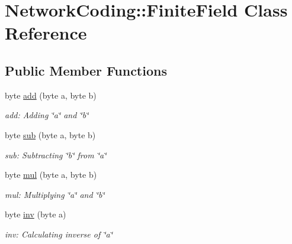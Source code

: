 \hypertarget{class_network_coding_1_1_finite_field}{}\section{Network\+Coding\+:\+:Finite\+Field Class Reference}
\label{class_network_coding_1_1_finite_field}
\subsection*{Public Member Functions}
\begin{DoxyCompactItemize}
\item 
byte \hyperlink{class_network_coding_1_1_finite_field_ad5d01d29f41b81e04c2c38774d46f9df}{add} (byte a, byte b)\hypertarget{class_network_coding_1_1_finite_field_ad5d01d29f41b81e04c2c38774d46f9df}{}\label{class_network_coding_1_1_finite_field_ad5d01d29f41b81e04c2c38774d46f9df}

\begin{DoxyCompactList}\small\item\em add\+: Adding \char`\"{}a\char`\"{} and \char`\"{}b\char`\"{} \end{DoxyCompactList}\item 
byte \hyperlink{class_network_coding_1_1_finite_field_a4ab96138860cf53a2b2958f425e9702d}{sub} (byte a, byte b)\hypertarget{class_network_coding_1_1_finite_field_a4ab96138860cf53a2b2958f425e9702d}{}\label{class_network_coding_1_1_finite_field_a4ab96138860cf53a2b2958f425e9702d}

\begin{DoxyCompactList}\small\item\em sub\+: Subtracting \char`\"{}b\char`\"{} from \char`\"{}a\char`\"{} \end{DoxyCompactList}\item 
byte \hyperlink{class_network_coding_1_1_finite_field_affb07a8a5bb0d0d46d8e4ddd15e6eb71}{mul} (byte a, byte b)\hypertarget{class_network_coding_1_1_finite_field_affb07a8a5bb0d0d46d8e4ddd15e6eb71}{}\label{class_network_coding_1_1_finite_field_affb07a8a5bb0d0d46d8e4ddd15e6eb71}

\begin{DoxyCompactList}\small\item\em mul\+: Multiplying \char`\"{}a\char`\"{} and \char`\"{}b\char`\"{} \end{DoxyCompactList}\item 
byte \hyperlink{class_network_coding_1_1_finite_field_a9bc9e49525ea45553459fcee844325c7}{inv} (byte a)\hypertarget{class_network_coding_1_1_finite_field_a9bc9e49525ea45553459fcee844325c7}{}\label{class_network_coding_1_1_finite_field_a9bc9e49525ea45553459fcee844325c7}

\begin{DoxyCompactList}\small\item\em inv\+: Calculating inverse of \char`\"{}a\char`\"{} \end{DoxyCompactList}\end{DoxyCompactItemize}
